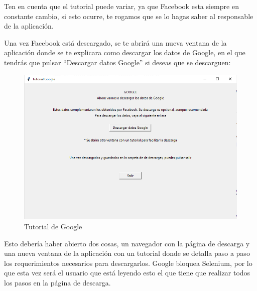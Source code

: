 Ten en cuenta que el tutorial puede variar, ya que Facebook esta siempre en constante cambio, si esto ocurre, te rogamos que se lo hagas saber al responsable de la aplicación.

Una vez Facebook está descargado, se te abrirá una nueva ventana de la aplicación donde se te explicara como descargar los datos de Google, en el que tendrás que pulsar ``Descargar datos Google'' si deseas que se descarguen:

\begin{figure}
	\begin{center}
		\includegraphics[scale=0.5]{Imagenes/Fuentes/TutorialDescargaG1.png} \caption{Tutorial de Google}
		\label{TutorialDescargaG1}
	\end{center}
\end{figure}

Esto debería haber abierto dos cosas, un navegador con la página de descarga y una nueva ventana de la aplicación con un tutorial donde se detalla paso a paso los requerimientos necesarios para descargarlos. Google bloquea Selenium, por lo que esta vez será el usuario que está leyendo esto el que tiene que realizar todos los pasos en la página de descarga.

